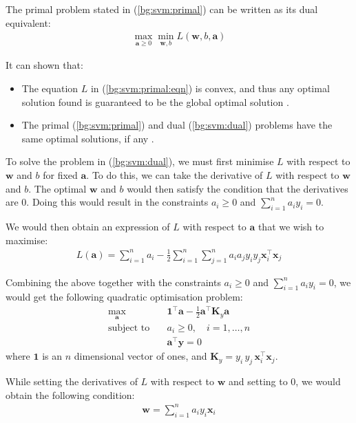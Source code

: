 \documentclass[12pt, twoside, a4paper]{article}
\def\vec{\boldsymbol}
\begin{document}
The primal problem stated in (\ref{bg:svm:primal}) can be written as its dual equivalent:
\begin{align}
\max_{\vec a \geq 0} \min_{\vec w, b} L(\vec w, b, \vec a) \label{bg:svm:dual}
\end{align}

It can shown that:
\begin{itemize}
\item The equation $L$ in (\ref{bg:svm:primal:eqn}) is convex, and thus any optimal solution found is guaranteed to be the global optimal solution \cite{RefWorks:123}.
\item The primal (\ref{bg:svm:primal}) and dual (\ref{bg:svm:dual}) problems have the same optimal solutions, if any \cite{RefWorks:124}.
\end{itemize}

To solve the problem in (\ref{bg:svm:dual}), we must first minimise $L$ with respect to $\vec w$ and $b$ for fixed $\vec a$. To do this, we can take the derivative of $L$ with respect to $\vec w$ and $b$. The optimal $\vec w$ and $b$ would then satisfy the condition that the derivatives are 0. Doing this would result in the constraints $a_i \geq 0$ and $\sum_{i=1}^n a_i y_i = 0$.

We would then obtain an expression of $L$ with respect to $\vec a$ that we wish to maximise:
\begin{align*}
L(\vec a) = \sum_{i=1}^n a_i - \frac{1}{2} \sum_{i=1}^n \sum_{j=1}^n a_i a_j y_i y_j \vec{x}_i^\top \vec{x}_j
\end{align*}

Combining the above together with the constraints $a_i \geq 0$ and $\sum_{i=1}^n a_i y_i = 0$, we would get the following quadratic optimisation problem:
\begin{align*}
\max_{\vec a} \quad &\vec{1}^\top \vec a - \frac{1}{2} \vec{a}^\top \vec{K}_y \vec{a} \\
\text{subject to} \quad &a_i \geq 0, \quad i = 1, \dots , n \\
&\vec{a}^\top \vec y = 0
\end{align*}
where $\vec{1}$ is an $n$ dimensional vector of ones, and $\vec{K}_y = y_i \, y_j \, \vec{x}_i^\top \vec{x}_j$.

While setting the derivatives of $L$ with respect to $\vec{w}$ and setting to 0, we would obtain the following condition:
\begin{align*}
\vec{w} = \sum_{i=1}^n a_i y_i \vec{x}_i
\end{align*}
\end{document}
